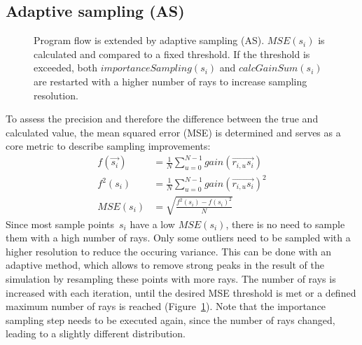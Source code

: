 \subsection{Adaptive sampling (AS)}
\label{subsec:adaptive_sampling}
\begin{figure}[H]
  \centerline
  {}
  \caption{Program flow is extended by adaptive sampling
    (AS). $MSE(s_i)$ is calculated and compared to a fixed
    threshold. If the threshold is exceeded, both
    $importanceSampling(s_i)$ and $calcGainSum(s_i)$ are restarted
    with a higher number of rays to increase sampling resolution.}
  \label{graphic:pap3}
\end{figure}
To assess the precision
and therefore the difference between the true and calculated value,
the mean squared error (MSE) is determined and serves as a core metric to
describe sampling improvements:
\begin{align}
     f(\vec{s_i}) &= \frac{1}{N} \sum_{u=0}^{N-1} gain(\overrightarrow{r_{i,u}s_i})\\
     f^2(s_i)     &= \frac{1}{N} \sum_{u=0}^{N-1} gain(\overrightarrow{r_{i,u}s_i})^2\\
     MSE(s_i)     &= \sqrt{\frac{f^2(s_i) - f(s_i)^2}{N}}
\end{align}
Since most sample points~$s_i$ have a low $MSE(s_i)$, there is no need
to sample them with a high number of rays. Only some outliers need to
be sampled with a higher resolution to reduce the occuring variance. This can be done with an adaptive
method, which allows to remove strong peaks in the result
of the simulation by resampling these points with more rays. The number of rays
is increased with each iteration, until the desired MSE threshold is met or 
a defined maximum number of rays is reached (Figure~\ref{graphic:pap3}).
Note that the importance sampling step needs to be executed again, since
the number of rays changed, leading to a slightly different distribution.

